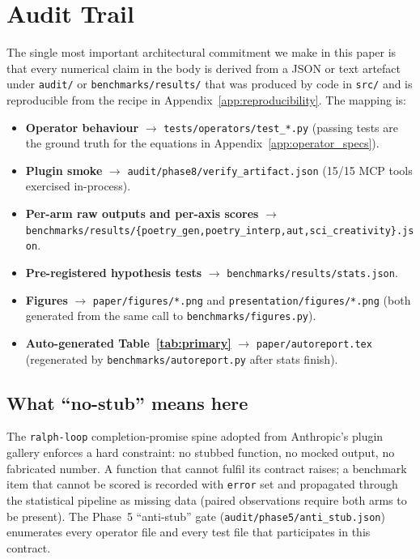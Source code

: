 \section{Audit Trail}\label{app:audit}

The single most important architectural commitment we make in this paper is that every numerical claim in the body is derived from a JSON or text artefact under \texttt{audit/} or \texttt{benchmarks/results/} that was produced by code in \texttt{src/} and is reproducible from the recipe in Appendix~\ref{app:reproducibility}. The mapping is:

\begin{itemize}[leftmargin=1.2em]
\item \textbf{Operator behaviour} $\rightarrow$ \texttt{tests/operators/test\_*.py} (passing tests are the ground truth for the equations in Appendix~\ref{app:operator_specs}).
\item \textbf{Plugin smoke} $\rightarrow$ \texttt{audit/phase8/verify\_artifact.json} (15/15 MCP tools exercised in-process).
\item \textbf{Per-arm raw outputs and per-axis scores} $\rightarrow$ \texttt{benchmarks/results/\{poetry\_gen,poetry\_interp,aut,sci\_creativity\}.json}.
\item \textbf{Pre-registered hypothesis tests} $\rightarrow$ \texttt{benchmarks/results/stats.json}.
\item \textbf{Figures} $\rightarrow$ \texttt{paper/figures/*.png} and \texttt{presentation/figures/*.png} (both generated from the same call to \texttt{benchmarks/figures.py}).
\item \textbf{Auto-generated Table~\ref{tab:primary}} $\rightarrow$ \texttt{paper/autoreport.tex} (regenerated by \texttt{benchmarks/autoreport.py} after stats finish).
\end{itemize}

\subsection{What ``no-stub'' means here}

The \texttt{ralph-loop} completion-promise spine adopted from Anthropic's plugin gallery enforces a hard constraint: no stubbed function, no mocked output, no fabricated number. A function that cannot fulfil its contract raises; a benchmark item that cannot be scored is recorded with \texttt{error} set and propagated through the statistical pipeline as missing data (paired observations require both arms to be present). The Phase~5 ``anti-stub'' gate (\texttt{audit/phase5/anti\_stub.json}) enumerates every operator file and every test file that participates in this contract.

